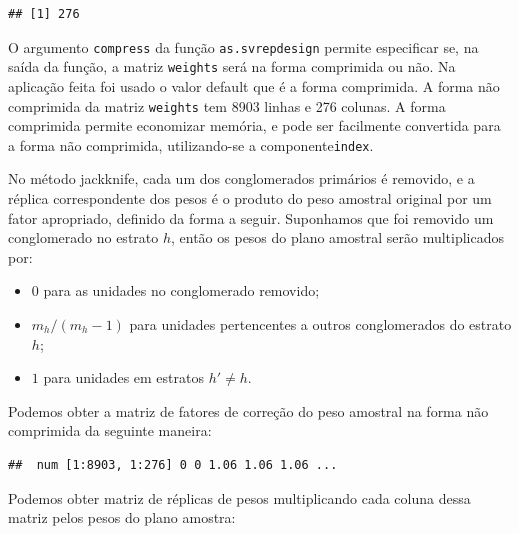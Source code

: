 \documentclass[]{book}
\newenvironment{Shaded}{\begin{snugshade}}{\end{snugshade}}
\newcommand{\KeywordTok}[1]{\textcolor[rgb]{0.13,0.29,0.53}{\textbf{#1}}}
\newcommand{\DecValTok}[1]{\textcolor[rgb]{0.00,0.00,0.81}{#1}}
\newcommand{\StringTok}[1]{\textcolor[rgb]{0.31,0.60,0.02}{#1}}
\newcommand{\OperatorTok}[1]{\textcolor[rgb]{0.81,0.36,0.00}{\textbf{#1}}}
\newcommand{\NormalTok}[1]{#1}
\providecommand{\tightlist}{%
  \setlength{\itemsep}{0pt}\setlength{\parskip}{0pt}}
\theoremstyle{definition}
\theoremstyle{definition}
\theoremstyle{definition}
\theoremstyle{remark}
\begin{document}
\begin{verbatim}
## [1] 276
\end{verbatim}

O argumento \texttt{compress} da função \texttt{as.svrepdesign} permite
especificar se, na saída da função, a matriz \texttt{weights} será na
forma comprimida ou não. Na aplicação feita foi usado o valor default
que é a forma comprimida. A forma não comprimida da matriz
\texttt{weights} tem 8903 linhas e 276 colunas. A forma comprimida
permite economizar memória, e pode ser facilmente convertida para a
forma não comprimida, utilizando-se a componente\texttt{index}.

No método jackknife, cada um dos conglomerados primários é removido, e a
réplica correspondente dos pesos é o produto do peso amostral original
por um fator apropriado, definido da forma a seguir. Suponhamos que foi
removido um conglomerado no estrato \(h\), então os pesos do plano
amostral serão multiplicados por:

\begin{itemize}
\tightlist
\item
  \(0\) para as unidades no conglomerado removido;
\item
  \(m_h/(m_h-1)\) para unidades pertencentes a outros conglomerados do
  estrato \(h\);
\item
  \(1\) para unidades em estratos \(h'\neq h\).
\end{itemize}

Podemos obter a matriz de fatores de correção do peso amostral na forma
não comprimida da seguinte maneira:

\begin{Shaded}
\end{Shaded}

\begin{verbatim}
##  num [1:8903, 1:276] 0 0 1.06 1.06 1.06 ...
\end{verbatim}

Podemos obter matriz de réplicas de pesos multiplicando cada coluna
dessa matriz pelos pesos do plano amostra:
\end{document}
